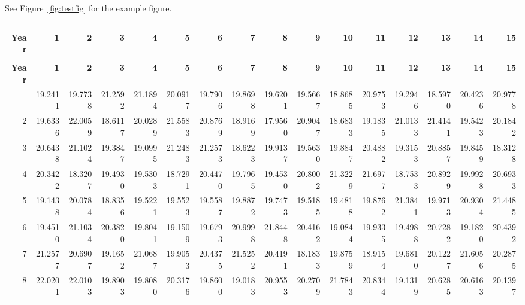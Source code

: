 \documentclass[12pt]{article}\usepackage[]{graphicx}\usepackage[]{color}
\begin{document}
See Figure~\ref{fig:testfig} for the example figure.

\clearpage

\begingroup\fontsize{8}{10}\selectfont
\begin{landscape}
\begin{longtable}[t]{rrrrrrrrrrrrrrrr}
\caption{\label{tab:widelong}A long and wide table}\\
\toprule
\textbf{Year} & \textbf{1} & \textbf{2} & \textbf{3} & \textbf{4} & \textbf{5} & \textbf{6} & \textbf{7} & \textbf{8} & \textbf{9} & \textbf{10} & \textbf{11} & \textbf{12} & \textbf{13} & \textbf{14} & \textbf{15}\\
\midrule
\endfirsthead
\caption*{}\\
\toprule
\textbf{Year} & \textbf{1} & \textbf{2} & \textbf{3} & \textbf{4} & \textbf{5} & \textbf{6} & \textbf{7} & \textbf{8} & \textbf{9} & \textbf{10} & \textbf{11} & \textbf{12} & \textbf{13} & \textbf{14} & \textbf{15}\\
\midrule
\endhead
\
\endfoot
\bottomrule
\endlastfoot
1 & 19.2411 & 19.7738 & 21.2592 & 21.1894 & 20.0917 & 19.7906 & 19.8698 & 19.6201 & 19.5667 & 18.8685 & 20.9753 & 19.2946 & 18.5970 & 20.4236 & 20.9778\\
2 & 19.6336 & 22.0059 & 18.6117 & 20.0289 & 21.5583 & 20.8769 & 18.9169 & 17.9560 & 20.9047 & 18.6833 & 19.1835 & 21.0133 & 21.4141 & 19.5423 & 20.1842\\
3 & 20.6438 & 21.1024 & 19.3847 & 19.0995 & 21.2483 & 21.2573 & 18.6223 & 19.9137 & 19.5630 & 19.8847 & 20.4882 & 19.3153 & 20.8857 & 19.8459 & 18.3128\\
4 & 20.3422 & 18.3207 & 19.4930 & 19.5303 & 18.7291 & 20.4470 & 19.7965 & 19.4530 & 20.8002 & 21.3229 & 21.6977 & 18.7533 & 20.8929 & 19.9928 & 20.6933\\
5 & 19.1438 & 20.0784 & 18.8356 & 19.5221 & 19.5523 & 19.5587 & 19.8872 & 19.7473 & 19.5185 & 19.4818 & 19.8762 & 21.3841 & 19.9713 & 20.9304 & 21.4485\\
6 & 19.4510 & 21.1034 & 20.3820 & 19.8041 & 19.1509 & 19.6793 & 20.9998 & 21.8448 & 20.4162 & 19.0844 & 19.9335 & 19.4988 & 20.7282 & 19.1820 & 20.4392\\
7 & 21.2577 & 20.6907 & 19.1652 & 21.0687 & 19.9053 & 20.4375 & 21.5252 & 20.4191 & 18.1833 & 19.8759 & 18.9154 & 19.6810 & 20.1227 & 21.6056 & 20.2875\\
8 & 22.0201 & 22.0103 & 19.8903 & 19.8080 & 20.3176 & 19.8600 & 19.0183 & 20.9553 & 20.2709 & 21.7843 & 20.8344 & 19.1319 & 20.6285 & 20.6163 & 20.1397\\

\end{longtable}
\end{landscape}
\end{document}
